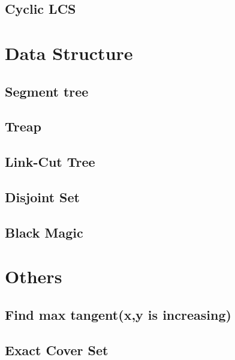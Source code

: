 \documentclass[a4paper,10pt,twocolumn,oneside]{article}
\begin{document}
\subsection{Cyclic LCS}


\section{Data Structure}

\subsection{Segment tree}


\subsection{Treap}


\subsection{Link-Cut Tree}


\subsection{Disjoint Set}


%

%

\subsection{Black Magic}


\section{Others}

\subsection{Find max tangent(x,y is increasing)}


\subsection{Exact Cover Set}


%


\end{document}

